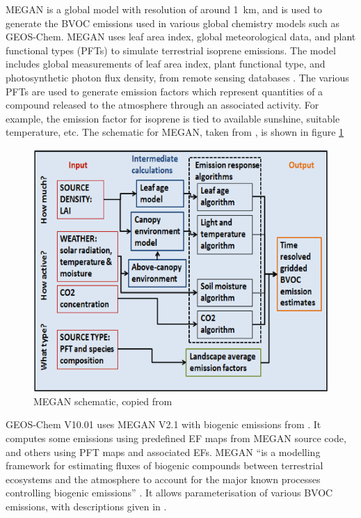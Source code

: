     MEGAN is a global model with resolution of around 1~km, and is used to generate the BVOC emissions used in various global chemistry models such as GEOS-Chem.
    MEGAN uses leaf area index, global meteorological data, and plant functional types (PFTs) to simulate terrestrial isoprene emissions.
    The model includes global measurements of leaf area index, plant functional type, and photosynthetic photon flux density, from remote sensing databases \parencite{Kefauver2014}.
    The various PFTs are used to generate emission factors which represent quantities of a compound released to the atmosphere through an associated activity.
    For example, the emission factor for isoprene is tied to available sunshine, suitable temperature, etc.
    The schematic for MEGAN, taken from \textcite{Megan_Website}, is shown in figure \ref{Models:GC:Isop:MEGAN:fig_megan_schematic}
    
    \begin{figure}
      \includegraphics[width=\textwidth]{Figures/MEGANmodel_img.jpg}
      \caption{MEGAN schematic, copied from \textcite{Megan_Website}}
      \label{Models:GC:Isop:MEGAN:fig_megan_schematic}
    \end{figure}
    
    GEOS-Chem V10.01 uses MEGAN V2.1 with biogenic emissions from \textcite{Guenther2012}.
    It computes some emissions using predefined EF maps from MEGAN source code, and others using PFT maps and associated EFs.
    MEGAN ``is a modelling framework for estimating fluxes of biogenic compounds between terrestrial ecosystems and the atmosphere to account for the major known processes controlling biogenic emissions'' \parencite{Guenther2012}.
    It allows parameterisation of various BVOC emissions, with descriptions given in \textcite{Guenther2012}.
    
